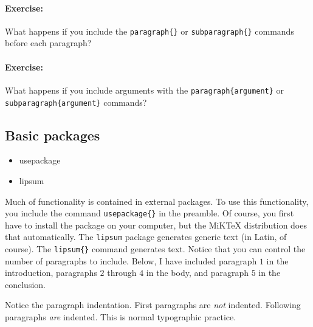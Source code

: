         \paragraph{Exercise:}What happens if you include the \texttt{paragraph\{\}} or \texttt{subparagraph\{\}} commands before each paragraph? 
        
        \paragraph{Exercise:}What happens if you include arguments with the \texttt{paragraph\{argument\}} or \texttt{subparagraph\{argument\}} commands? 

        \subsection{Basic packages}
        \label{Basic packages}
        
        \begin{cmd}
            \begin{itemize}
                \item{usepackage}
                \item{lipsum}
            \end{itemize}
        \end{cmd}

Much of \Lx{} functionality is contained in external packages. To use this functionality, you include the command \texttt{usepackage\{\}} in the preamble. Of course, you first have to install the package on your computer, but the MiKTeX distribution does that automatically. The \texttt{lipsum} package generates generic text (in Latin, of course). The \texttt{lipsum\{\}} command generates text. Notice that you can control the number of paragraphs to include. Below, I have included paragraph $1$ in the introduction, paragraphs $2$ through $4$ in the body, and paragraph $5$ in the conclusion.

Notice the paragraph indentation. First paragraphs are \textit{not} indented. Following paragraphs \textit{are} indented. This is normal typographic practice.

